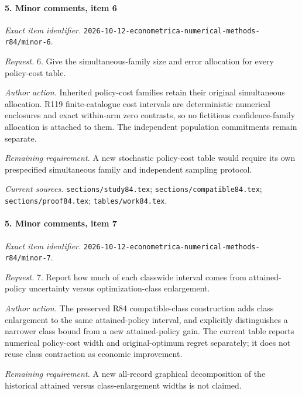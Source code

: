 \paragraph{5. Minor comments, item 6}

\emph{Exact item identifier.} \nolinkurl{2026-10-12-econometrica-numerical-methods-r84/minor-6}.

\par\emph{Request.} 6. Give the simultaneous-family size and error allocation for every policy-cost table.

\par\emph{Author action.} Inherited policy-cost families retain their original simultaneous allocation. R119 finite-catalogue cost intervals are deterministic numerical enclosures and exact within-arm zero contrasts, so no fictitious confidence-family allocation is attached to them. The independent population commitments remain separate.

\par\emph{Remaining requirement.} A new stochastic policy-cost table would require its own prespecified simultaneous family and independent sampling protocol.

\par\emph{Current sources.} \nolinkurl{sections/study84.tex}; \nolinkurl{sections/compatible84.tex}; \nolinkurl{sections/proof84.tex}; \nolinkurl{tables/work84.tex}.

\paragraph{5. Minor comments, item 7}

\emph{Exact item identifier.} \nolinkurl{2026-10-12-econometrica-numerical-methods-r84/minor-7}.

\par\emph{Request.} 7. Report how much of each classwide interval comes from attained-policy uncertainty versus optimization-class enlargement.

\par\emph{Author action.} The preserved R84 compatible-class construction adds class enlargement to the same attained-policy interval, and explicitly distinguishes a narrower class bound from a new attained-policy gain. The current table reports numerical policy-cost width and original-optimum regret separately; it does not reuse class contraction as economic improvement.

\par\emph{Remaining requirement.} A new all-record graphical decomposition of the historical attained versus class-enlargement widths is not claimed.

